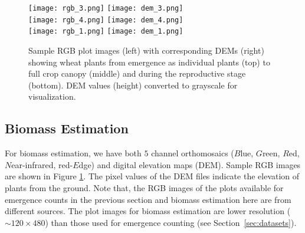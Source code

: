 \documentclass[10pt,twocolumn,letterpaper]{article}
\begin{document}
\begin{figure}[]
	\centering
	\texttt{[image: rgb\_3.png]}
	\texttt{[image: dem\_3.png]} \\
	\texttt{[image: rgb\_4.png]}
	\texttt{[image: dem\_4.png]} \\
	\texttt{[image: rgb\_1.png]}
	\texttt{[image: dem\_1.png]}
    \caption{Sample RGB plot images (left) with corresponding DEMs (right) showing wheat plants from emergence as individual plants (top) to full crop canopy (middle) and during the reproductive stage (bottom). DEM values (height) converted to grayscale for visualization.}
    \label{fig:sample_RGBE}
\end{figure}

\subsection{Biomass Estimation}

For biomass estimation, we have both $5$ channel orthomosaics ($B$lue, $G$reen, $R$ed, $N$ear-infrared, red-$E$dge) and digital elevation maps (DEM). Sample RGB images are shown in Figure \ref{fig:sample_RGBE}.  The pixel values of the DEM files indicate the elevation of plants from the ground. Note that, the RGB images of the plots available for emergence counts in the previous section and biomass estimation here are from different sources. The plot images for biomass estimation are lower resolution ($\sim120\times480$) than those used for emergence counting (see Section~\ref{sec:datasets}).

\end{document}
